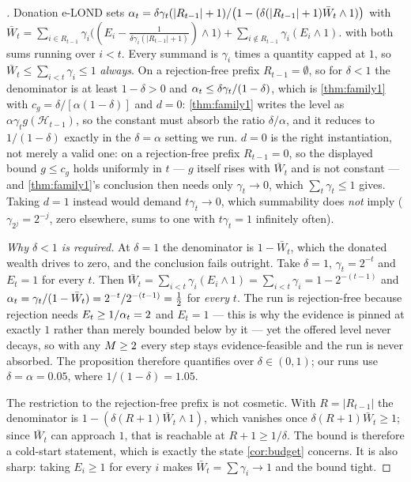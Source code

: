 \begin{proof}[]
Donation e-LOND sets
$\alpha_t = \delta\gamma_t(\lvert R_{t-1}\rvert+1) / \bigl(1 - (\delta(\lvert R_{t-1}\rvert+1)\bar W_t \wedge 1)\bigr)$
with
$\bar W_t = \sum_{i\in R_{t-1}} \gamma_i\bigl((E_i - \tfrac{1}{\delta\gamma_i(\lvert R_{t-1}\rvert+1)}) \wedge 1\bigr)
+ \sum_{i\notin R_{t-1}} \gamma_i (E_i \wedge 1)$.
with both sums running over $i<t$. Every summand is $\gamma_i$ times a quantity capped at $1$, so
$\bar W_t \le \sum_{i<t} \gamma_i \le 1$ \emph{always}. On a rejection-free prefix
$R_{t-1}=\emptyset$, so for $\delta<1$ the denominator is at least $1-\delta>0$ and
$\alpha_t \le \delta\gamma_t/(1-\delta)$, which is \cref{thm:family1} with
$c_g = \delta/[\alpha(1-\delta)]$ and $d = 0$: \cref{thm:family1} writes the level as
$\alpha\gamma_t g(\mathcal{H}_{t-1})$, so the constant must absorb the ratio $\delta/\alpha$, and it
reduces to $1/(1-\delta)$ exactly in the $\delta=\alpha$ setting we run. $d=0$ is the right
instantiation, not merely a valid one: on a rejection-free prefix $R_{t-1}=0$, so the displayed bound
$g\le c_g$ holds uniformly in $t$ --- $g$ itself rises with $\bar W_t$ and is not constant --- and
\cref{thm:family1}'s conclusion then needs only $\gamma_t\to0$, which $\sum_t\gamma_t\le1$ gives.
Taking $d=1$ instead would demand $t\gamma_t\to0$, which summability does \emph{not} imply
($\gamma_{2^j}=2^{-j}$, zero elsewhere, sums to one with $t\gamma_t=1$ infinitely often).

\emph{Why $\delta<1$ is required.} At $\delta=1$ the denominator is $1-\bar W_t$, which the donated
wealth drives to zero, and the conclusion fails outright. Take $\delta=1$, $\gamma_t=2^{-t}$ and
$E_t=1$ for every $t$. Then $\bar W_t=\sum_{i<t}\gamma_i(E_i\wedge1)=\sum_{i<t}\gamma_i=1-2^{-(t-1)}$
and $\alpha_t=\gamma_t/(1-\bar W_t)=2^{-t}/2^{-(t-1)}=\tfrac12$ for \emph{every} $t$. The run is
rejection-free because rejection needs $E_t\ge1/\alpha_t=2$ and $E_t=1$ --- this is why the evidence is
pinned at exactly $1$ rather than merely bounded below by it --- yet the offered level never decays, so
with any $M\ge2$ every step stays evidence-feasible and the run is never absorbed. The proposition
therefore quantifies over $\delta\in(0,1)$; our runs use $\delta=\alpha=0.05$, where
$1/(1-\delta)=1.05$.

The restriction to the rejection-free prefix is not cosmetic. With $R = \lvert R_{t-1}\rvert$ the
denominator is $1 - (\delta(R+1)\bar W_t \wedge 1)$, which vanishes once $\delta(R+1)\bar W_t \ge 1$;
since $\bar W_t$ can approach $1$, that is reachable at $R+1 \ge 1/\delta$. The bound is therefore a
cold-start statement, which is exactly the state \cref{cor:budget} concerns. It is also sharp: taking
$E_i \ge 1$ for every $i$ makes $\bar W_t = \sum\gamma_i \to 1$ and the bound tight.
\end{proof}


